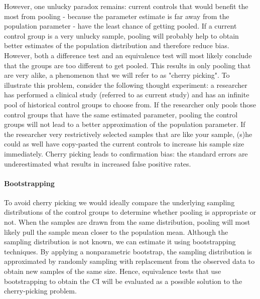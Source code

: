\documentclass[Royal,sagev,times]{sagej}
\begin{document}
However, one unlucky paradox remains: current controls that would benefit the most from pooling - because the parameter estimate is far away from the population parameter - have the least chance of getting pooled. If a current control group is a very unlucky sample,  pooling will probably help to obtain better estimates of the population distribution and therefore reduce bias. However, both a difference test and an equivalence test will most likely conclude that the groups are too different to get pooled. This results in only pooling that are very alike, a phenomenon that we will refer to as "cherry picking". To illustrate this problem, consider the following thought experiment: a researcher has performed a clinical study (referred to as current study) and has an infinite pool of historical control groups to choose from. If the researcher only pools those control groups that have the same estimated parameter, pooling the control groups will not lead to a better approximation of the population parameter. If the researcher very restrictively selected samples that are like your sample, (s)he could as well have copy-pasted the current controls to increase his sample size immediately. Cherry picking leads to confirmation bias: the standard errors are underestimated what results in increased false positive rates.

\paragraph{Bootstrapping}
To avoid cherry picking we would ideally compare the underlying sampling distributions of the control groups to determine whether pooling is appropriate or not. When the samples are drawn from the same distribution, pooling will most likely pull the sample mean closer to the population mean. Although the sampling distribution is not known, we can estimate it using bootstrapping techniques.\cite{kulesa2015}\cite{koti2013} By applying a nonparametric bootstrap, the sampling distribution is approximated by randomly sampling with replacement from the observed data to obtain new samples of the same size.\cite{kulesa2015} Hence, equivalence tests that use bootstrapping to obtain the CI will be evaluated as a possible solution to the cherry-picking problem.
\end{document}
